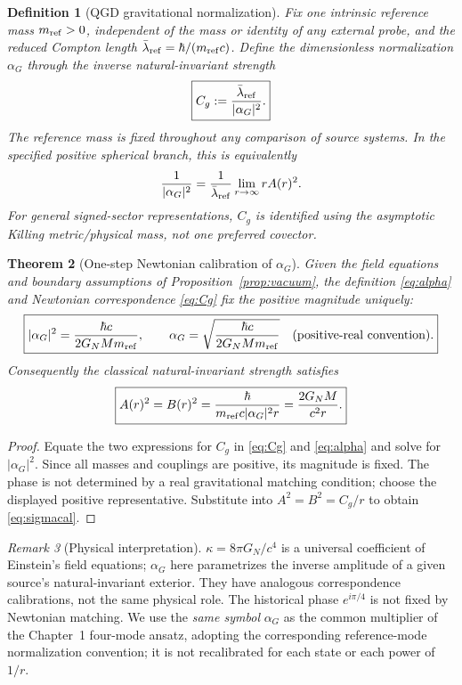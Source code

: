 \documentclass[11pt,a4paper]{article}
\newtheorem{theorem}{Theorem}[section]
\newtheorem{definition}[theorem]{Definition}
\theoremstyle{remark}
\newtheorem{remark}[theorem]{Remark}
\begin{document}
\begin{definition}[QGD gravitational normalization]\label{def:ageom}
Fix one intrinsic reference mass $m_{\rm ref}>0$, independent of the mass
or identity of any external probe, and the reduced Compton length
$\bar\lambda_{\rm ref}=\hbar/(m_{\rm ref}c)$. Define the dimensionless
normalization $\alpha_G$ through the \emph{inverse natural-invariant strength}
\begin{equation}\label{eq:alpha}
 \boxed{C_g:=\frac{\bar\lambda_{\rm ref}}{|\alpha_G|^2}.}
\end{equation}
The reference mass is fixed throughout any comparison of source systems.
In the specified positive spherical branch, this is equivalently
\begin{equation}\label{eq:asymptotic}
 \frac{1}{|\alpha_G|^2}
 =\frac{1}{\bar\lambda_{\rm ref}}\lim_{r\to\infty}rA(r)^2.
\end{equation}
For general signed-sector representations, $C_g$ is identified using
the asymptotic Killing metric/physical mass, not one preferred covector.
\end{definition}

\begin{theorem}[One-step Newtonian calibration of $\alpha_G$]\label{thm:alpha}
Given the field equations and boundary assumptions of Proposition~\ref{prop:vacuum},
the definition \eqref{eq:alpha} and Newtonian correspondence \eqref{eq:Cg}
fix the positive magnitude uniquely:
\begin{equation}\label{eq:alpha-result}
 \boxed{|\alpha_G|^2=\frac{\hbar c}{2G_NM m_{\rm ref}},\qquad
 \alpha_G=\sqrt{\frac{\hbar c}{2G_NM m_{\rm ref}}}\quad
 \text{(positive-real convention)}.}
\end{equation}
Consequently the classical natural-invariant strength satisfies
\begin{equation}\label{eq:sigmacal}
 \boxed{A(r)^2=B(r)^2
 =\frac{\hbar}{m_{\rm ref}c|\alpha_G|^2r}
 =\frac{2G_NM}{c^2r}.}
\end{equation}
\end{theorem}
\begin{proof}
Equate the two expressions for $C_g$ in \eqref{eq:Cg} and
\eqref{eq:alpha} and solve for $|\alpha_G|^2$. Since all masses and
couplings are positive, its magnitude is fixed. The phase is not determined
by a real gravitational matching condition; choose the displayed positive
representative. Substitute into $A^2=B^2=C_g/r$ to obtain \eqref{eq:sigmacal}.
\end{proof}
\begin{remark}[Physical interpretation]
$\kappa=8\pi G_N/c^4$ is a universal coefficient of Einstein's field equations;
$\alpha_G$ here parametrizes the inverse amplitude of a given source's
natural-invariant exterior. They have analogous correspondence calibrations,
not the same physical role. The historical phase $e^{i\pi/4}$ is not fixed by
Newtonian matching. We use the \emph{same symbol} $\alpha_G$ as the common
multiplier of the Chapter~1 four-mode ansatz, adopting the corresponding
reference-mode normalization convention; it is not recalibrated for each
state or each power of $1/r$.
\end{remark}
\end{document}
